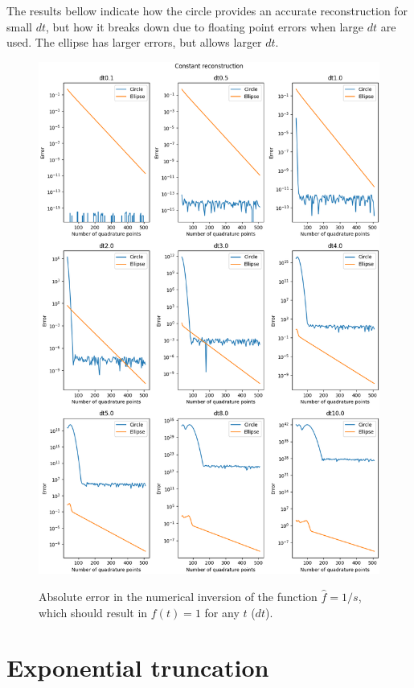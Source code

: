 \documentclass[10pt,a4paper,final]{article}
\begin{document}
The results bellow indicate how the circle provides an accurate reconstruction for small $dt$, but how it breaks down due to floating point errors when large $dt$ are used. The ellipse has larger errors, but allows larger $dt$.

\begin{figure}
\centering

\includegraphics[scale=0.5]{const_recon}
\label{fig:const}
\caption{Absolute error in the numerical inversion of the function $\widehat{f}=1/s$, which should result in $f(t)=1$ for any $t$ ($dt$). }
\end{figure}


\clearpage 
\section{Exponential truncation}
\end{document}
